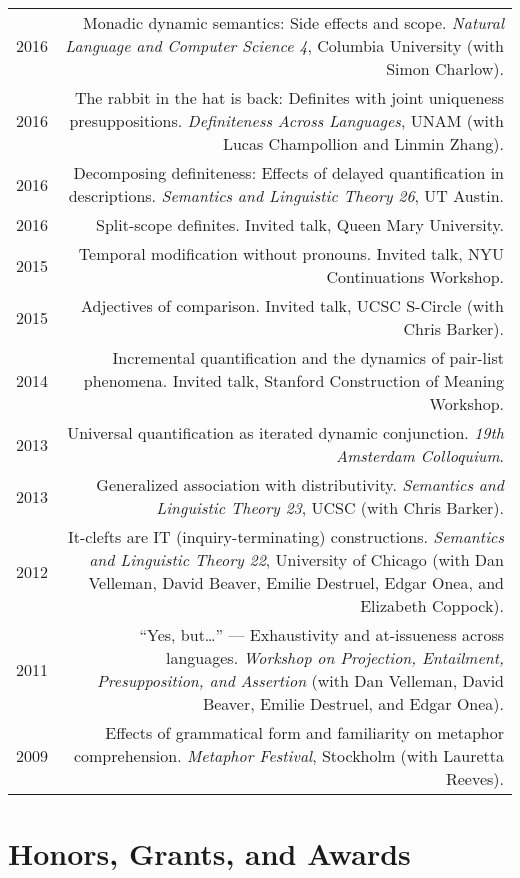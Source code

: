 \documentclass[11pt]{article}
\begin{document}
\begin{longtable}{LR}
  2016 &  Monadic dynamic semantics: Side effects and scope. \textit{Natural
          Language and Computer Science 4}, Columbia University (with Simon
          Charlow).\\
  2016 &  The rabbit in the hat is back: Definites with joint uniqueness
          presuppositions. \textit{Definiteness Across Languages}, UNAM (with
          Lucas Champollion and Linmin Zhang).\\
  2016 &  Decomposing definiteness: Effects of delayed quantification in
          descriptions. \textit{Semantics and Linguistic Theory 26}, UT Austin.\\
  2016 &  Split-scope definites. Invited talk, Queen Mary University.\\
  2015 &  Temporal modification without pronouns. Invited talk, NYU
          Continuations Workshop.\\
  2015 &  Adjectives of comparison. Invited talk, UCSC S-Circle (with Chris
          Barker).\\
  2014 &  Incremental quantification and the dynamics of pair-list phenomena.
          Invited talk, Stanford Construction of Meaning Workshop.\\
  2013 &  Universal quantification as iterated dynamic conjunction. \textit{19th
          Amsterdam Colloquium}.\\
  2013 &  Generalized association with distributivity. \textit{Semantics and
          Linguistic Theory 23}, UCSC (with Chris Barker).\\
  2012 &  It-clefts are IT (inquiry-terminating) constructions.
          \textit{Semantics and Linguistic Theory 22}, University of Chicago
          (with Dan Velleman, David Beaver, Emilie Destruel, Edgar Onea, and
          Elizabeth Coppock).\\
  2011 &  ``Yes, but\dots'' --- Exhaustivity and at-issueness across languages.
          \textit{Workshop on Projection, Entailment, Presupposition, and
          Assertion} (with Dan Velleman, David Beaver, Emilie Destruel, and
          Edgar Onea).\\
  2009 &  Effects of grammatical form and familiarity on metaphor
          comprehension. \textit{Metaphor Festival}, Stockholm (with Lauretta Reeves).
\end{longtable}


\section*{Honors, Grants, and Awards}
\end{document}

